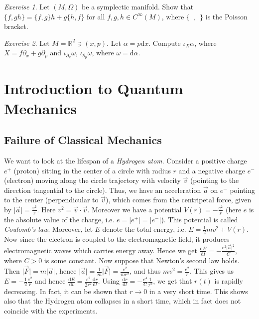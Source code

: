 \documentclass[11pt]{amsart}
\numberwithin{equation}{section}
\theoremstyle{plain}
\theoremstyle{definition}
\theoremstyle{remark}
\newtheorem{exe}{Exercise}[subsection]
\newcommand{\R}{\mathbb{R}}
\newcommand{\dd}{{\mathrm{d}}}
\begin{document}
\begin{exe}
Let $(M,\Omega)$ be a symplectic manifold. Show that $\{f,gh\}=\{f,g\}h+g\{h,f\}$ for all $f,g,h\in C^\infty(M)$, where $\{\enspace,\enspace\}$ is the Poisson bracket.
\end{exe}

\begin{exe}
Let $M=\R^2\ni (x,p)$. Let $\alpha=p\dd x$. Compute $\iota_X\alpha$, where $X=f\partial_x+g\partial_p$ and $\iota_{\partial_x}\omega$, $\iota_{\partial_p}\omega$, where $\omega=\dd\alpha$.
\end{exe}

\section{Introduction to Quantum Mechanics}

\subsection{Failure of Classical Mechanics}
We want to look at the lifespan of a \emph{Hydrogen atom}. Consider a positive charge $e^+$ (proton) sitting in the center of a circle with radius $r$ and a negative charge $e^-$ (electron) moving along the circle trajectory with velocity $\vec{v}$ (pointing to the direction tangential to the circle). Thus, we have an acceleration $\vec{a}$ on $e^-$ pointing to the center (perpendicular to $\vec{v}$), which comes from the centripetal force, given by $\vert\vec{a}\vert=\frac{v^2}{r}$. Here $v^2=\vec{v}\cdot\vec{v}$. Moreover we have a potential $V(r)=-\frac{e^2}{r}$ (here $e$ is the absolute value of the charge, i.e. $e=\vert e^+\vert=\vert e^-\vert$). This potential is called \emph{Coulomb's law}. Moreover, let $E$ denote the total energy, i.e. $E=\frac{1}{2}mv^2+V(r)$. Now since the electron is coupled to the electromagnetic field, it produces electromagnetic waves which carries energy away. Hence we get
$\frac{\dd E}{\dd t}=-\frac{e^2\vert \vec{a}\vert^2}{C}$, where $C>0$ is some constant. Now suppose that Newton's second law holds. Then $\vert \vec{F}\vert=m\vert \vec{a}\vert$, hence $\vert \vec{a}\vert=\frac{1}{m}\vert\vec{F}\vert=\frac{e^2}{mr^2}$, and thus $mv^2=\frac{e^2}{r}$. This gives us $E=-\frac{1}{2}\frac{e^2}{r}$ and hence $\frac{\dd E}{\dd t}=\frac{e^2}{2r^2}\frac{\dd r}{\dd t}$. Using $\frac{\dd r}{\dd t}=-\frac{e^4}{C}\frac{1}{r^2}$, we get that $r(t)$ is rapidly decreasing. In fact, it can be shown that $r\to 0$ in a very short time. This shows also that the Hydrogen atom collapses in a short time, which in fact does not coincide with the experiments. 
\end{document}
